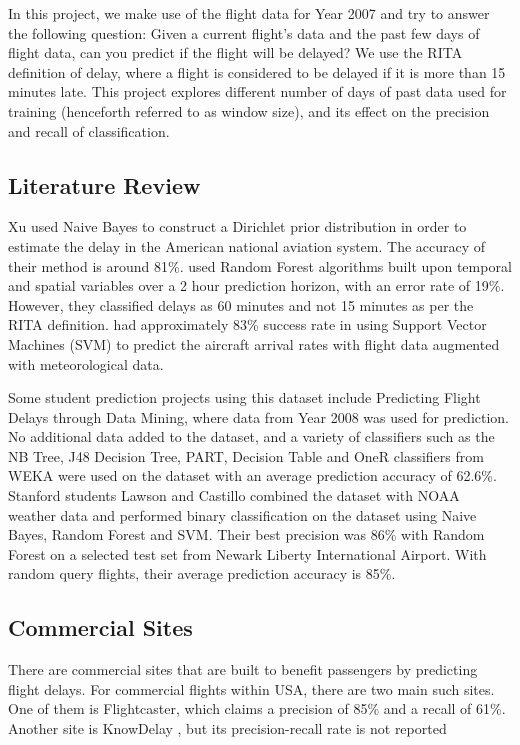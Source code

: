 \documentclass[letterpaper,11pt]{article}
\begin{document}
In this project, we make use of the flight data for Year 2007 and try to answer the following question: Given a current flight's data and the past few days of flight data, can you predict if the flight will be delayed? We use the RITA definition of delay, where a flight is considered to be delayed if it is more than 15 minutes late. This project explores different number of days of past data used for training (henceforth referred to as window size), and its effect on the precision and recall of classification. 

\subsection{Literature Review}
Xu \cite{Xu_1estimation} used Naive Bayes to construct a Dirichlet prior distribution in order to estimate the delay in the American national aviation system. The accuracy of their method is around 81\%. \cite{juannetwork} used Random Forest algorithms built upon temporal and spatial variables over a 2 hour prediction horizon, with an error rate of 19\%. However, they classified delays as 60 minutes and not 15 minutes as per the RITA definition. \cite{smithsvm} had approximately 83\% success rate in using Support Vector Machines (SVM) to predict the aircraft arrival rates with flight data augmented with meteorological data. 

Some student prediction projects using this dataset include Predicting Flight Delays through Data Mining\cite{bostonu}, where data from Year 2008 was used for prediction. No additional data added to the dataset, and a variety of classifiers such as the NB Tree, J48 Decision Tree, PART, Decision Table and OneR classifiers from WEKA were used on the dataset with an average prediction accuracy of 62.6\%. Stanford students Lawson and Castillo \cite{lawson} combined the dataset with NOAA weather data and performed binary classification on the dataset using Naive Bayes, Random Forest and SVM. Their best precision was 86\% with Random Forest on a selected test set from Newark Liberty International Airport. With random query flights, their average prediction accuracy is 85\%. 

\subsection{Commercial Sites}
There are commercial sites that are built to benefit passengers by predicting flight delays. For commercial flights within USA, there are two main such sites. One of them is Flightcaster, which claims a precision of 85\% and a recall of 61\%.\cite{flightcaster} Another site is KnowDelay \cite{knowdelay}, but its precision-recall rate is not reported
\end{document}
